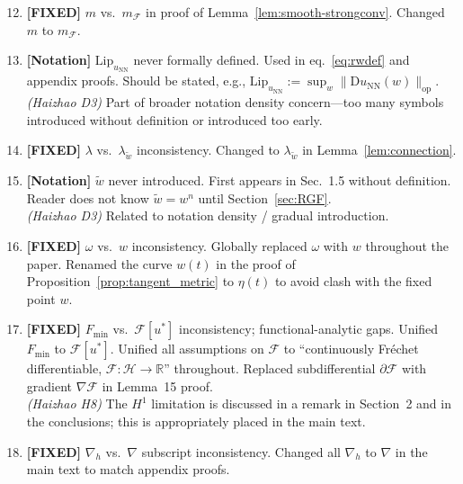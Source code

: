 \documentclass[twoside,11pt]{article}
\newcommand{\NN}{\mathrm{NN}}
\newcommand{\calF}{\mathcal{F}}
\newcommand{\calH}{\mathcal{H}}
\begin{document}
\begin{enumerate}\setcounter{enumi}{11}
\item {\color{green!50!black}\textbf{[FIXED]} $m$ vs.\ $m_\calF$ in proof of Lemma~\ref{lem:smooth-strongconv}.}
    Changed $m$ to $m_\calF$.

\item {\color{red}\textbf{[Notation]} $\mathrm{Lip}_{u_\NN}$ never formally defined.}
    Used in eq.~\eqref{eq:rwdef} and appendix proofs.
    Should be stated, e.g., $\mathrm{Lip}_{u_\NN}:=\sup_w\|\mathrm{D}u_\NN(w)\|_\mathrm{op}$.\\
    \emph{(Haizhao D3)} Part of broader notation density concern---too many
    symbols introduced without definition or introduced too early.

\item {\color{green!50!black}\textbf{[FIXED]} $\lambda$ vs.\ $\lambda_{\tilde w}$ inconsistency.}
    Changed to $\lambda_{\tilde w}$ in Lemma~\ref{lem:connection}.

\item {\color{red}\textbf{[Notation]} $\tilde w$ never introduced.}
    First appears in Sec.~1.5 without definition.
    Reader does not know $\tilde w = w^n$ until Section~\ref{sec:RGF}.\\
    \emph{(Haizhao D3)} Related to notation density / gradual introduction.

\item {\color{green!50!black}\textbf{[FIXED]} $\omega$ vs.\ $w$ inconsistency.}
    Globally replaced $\omega$ with $w$ throughout the paper. Renamed the
    curve $w(t)$ in the proof of Proposition~\ref{prop:tangent_metric}
    to $\eta(t)$ to avoid clash with the fixed point $w$.

\item {\color{green!50!black}\textbf{[FIXED]} $F_{\min}$ vs.\ $\calF[u^*]$ inconsistency; functional-analytic gaps.}
    Unified $F_{\min}$ to $\calF[u^*]$. Unified all assumptions on $\calF$ to
    ``continuously Fr\'echet differentiable, $\calF:\calH\to\mathbb{R}$'' throughout.
    Replaced subdifferential $\partial\calF$ with gradient $\nabla\calF$ in Lemma~15 proof.\\
    \emph{(Haizhao H8)} The $H^1$ limitation is discussed in a remark in Section~2
    and in the conclusions; this is appropriately placed in the main text.

\item {\color{green!50!black}\textbf{[FIXED]} $\nabla_h$ vs.\ $\nabla$ subscript inconsistency.}
    Changed all $\nabla_h$ to $\nabla$ in the main text to match appendix proofs.


\end{enumerate}
\end{document}
